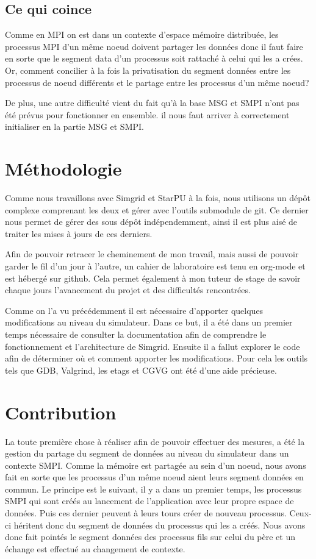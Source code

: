 \documentclass[smallextended]{svjour3}
\begin{document}
\subsection{Ce qui coince}
\label{sec-3-4}
Comme en MPI on est dans un contexte d'espace mémoire distribuée,
les processus MPI d'un même noeud doivent partager les données donc
il faut faire en sorte que le segment data d'un processus soit
rattaché à celui qui les a crées. Or, comment concilier à la fois
la privatisation du segment données entre les processus de noeud
différents et le partage entre les processus d'un même noeud?

De plus, une autre difficulté vient du fait qu'à la base MSG et
SMPI n'ont pas été prévus pour fonctionner en ensemble. il nous
faut arriver à correctement initialiser en la partie MSG et SMPI.

\section{Méthodologie}
\label{sec-4}
Comme nous travaillons avec Simgrid et StarPU à la fois, nous
utilisons un dépôt complexe comprenant les deux et gérer avec
l'outils submodule de git. Ce dernier nous permet de gérer des sous
dépôt indépendemment, ainsi il est plus aisé de traiter les mises à
jours de ces derniers.

Afin de pouvoir retracer le cheminement de mon travail, mais aussi
de pouvoir garder le fil d'un jour à l'autre, un cahier de
laboratoire est tenu en org-mode et est hébergé sur github. Cela permet
également à mon tuteur de stage de savoir chaque jours l'avancement
du projet et des difficultés rencontrées.

Comme on l'a vu précédemment il est nécessaire d'apporter quelques
modifications au niveau du simulateur. Dans ce but, il a été dans un
premier temps nécessaire de consulter la documentation afin de
comprendre le fonctionnement et l'architecture de Simgrid. Ensuite
il a fallut explorer le code afin de déterminer où et comment
apporter les modifications. Pour cela les outils tels que GDB,
Valgrind, les etags et CGVG ont été d'une aide précieuse.

\section{Contribution}
\label{sec-5}
La toute première chose à réaliser afin de pouvoir effectuer des
mesures, a été la gestion du partage du segment de données au niveau
du simulateur dans un contexte SMPI. Comme la mémoire est partagée
au sein d'un noeud, nous avons fait en sorte que les processus d'un
même noeud aient leurs segment données en commun. Le principe est le
suivant, il y a dans un premier temps, les processus SMPI qui sont
créés au lancement de l'application avec leur propre espace de
données. Puis ces dernier peuvent à leurs tours créer de nouveau
processus. Ceux-ci héritent donc du segment de données du processus
qui les a créés. Nous avons donc fait pointés le segment données des
processus fils sur celui du père et un échange est effectué au
changement de contexte.
\end{document}
